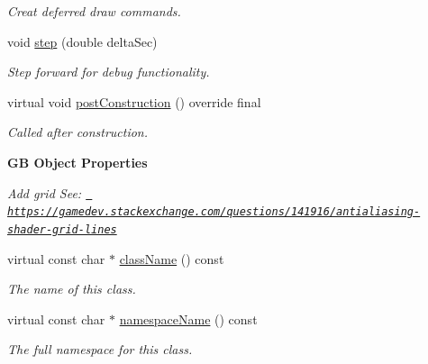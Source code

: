 \begin{Indent}
\begin{DoxyCompactItemize}
\begin{DoxyCompactList}\small\item\em Creat deferred draw commands. \end{DoxyCompactList}\item 
\mbox{\label{classrev_1_1_debug_manager_a478ee51f66d371ac5b3afa81b814cdb9}} 
void \mbox{\hyperlink{classrev_1_1_debug_manager_a478ee51f66d371ac5b3afa81b814cdb9}{step}} (double delta\+Sec)
\begin{DoxyCompactList}\small\item\em Step forward for debug functionality. \end{DoxyCompactList}\item 
\mbox{\label{classrev_1_1_debug_manager_a5fae9fc663600b490c2bb640c57d5019}} 
virtual void \mbox{\hyperlink{classrev_1_1_debug_manager_a5fae9fc663600b490c2bb640c57d5019}{post\+Construction}} () override final
\begin{DoxyCompactList}\small\item\em Called after construction. \end{DoxyCompactList}\end{DoxyCompactItemize}
\end{Indent}
\begin{Indent}\textbf{ GB Object Properties}\par
{\em Add grid See\+: \href{https://gamedev.stackexchange.com/questions/141916/antialiasing-shader-grid-lines}{\texttt{ https\+://gamedev.\+stackexchange.\+com/questions/141916/antialiasing-\/shader-\/grid-\/lines}} }\begin{DoxyCompactItemize}
\item 
virtual const char $\ast$ \mbox{\hyperlink{classrev_1_1_debug_manager_a5962e13755e5a3b902f2d3f71e5948cb}{class\+Name}} () const
\begin{DoxyCompactList}\small\item\em The name of this class. \end{DoxyCompactList}\item 
virtual const char $\ast$ \mbox{\hyperlink{classrev_1_1_debug_manager_a0f83cdbbd2ed91549fe2ae4fdf8809b6}{namespace\+Name}} () const
\begin{DoxyCompactList}\small\item\em The full namespace for this class. \end{DoxyCompactList}\end{DoxyCompactItemize}
\end{Indent}
